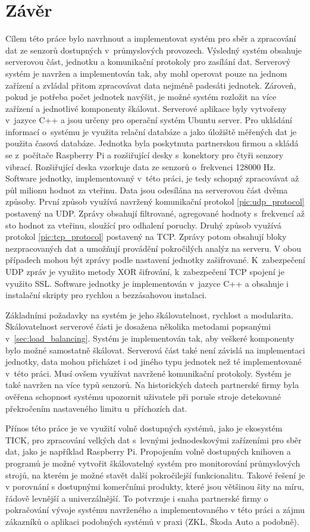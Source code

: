 \chapter{Závěr}
Cílem této práce bylo navrhnout a implementovat systém pro sběr a zpracování dat ze senzorů dostupných v~průmyslových provozech. Výsledný systém obsahuje serverovou část, jednotku a komunikační protokoly pro zasílání dat. Serverový systém je navržen a implementován tak, aby mohl operovat pouze na jednom zařízení a zvládal přitom zpracovávat data nejméně padesáti jednotek. Zároveň, pokud je potřeba počet jednotek navýšit, je možné systém rozložit na více zařízení a jednotlivé komponenty škálovat. Serverové aplikace byly vytvořeny v~jazyce C++ a jsou určeny pro operační systém Ubuntu server. Pro ukládání informací o~systému je využita relační databáze a jako úložiště měřených dat je použita časová databáze. Jednotka byla poskytnuta partnerskou firmou a skládá se z~počítače Raspberry Pi a rozšiřující desky s~konektory pro čtyři senzory vibrací. Rozšiřující deska vzorkuje data ze senzorů o~frekvenci 128000 Hz. Software jednotky, implementovaný v~této práci, je tedy schopný zpracovávat až půl milionu hodnot za vteřinu. Data jsou odesílána na serverovou část dvěma způsoby. První způsob využívá navržený komunikační protokol \ref{pic:udp_protocol} postavený na UDP. Zprávy obsahují filtrované, agregované hodnoty s~frekvencí až sto hodnot za vteřinu, sloužící pro odhalení poruchy. Druhý způsob využívá protokol \ref{pic:tcp_protocol} postavený na TCP. Zprávy potom obsahují bloky nezpracovaných dat a umožňují provádění pokročilých analýz na serveru. V obou případech mohou být zprávy podle nastavení jednotky zašifrované. K~zabezpečení UDP zpráv je využito metody XOR šifrování, k~zabezpečení TCP spojení je využito SSL. Software jednotky je implementován v~jazyce C++ a obsahuje i instalační skripty pro rychlou a bezzásahovou instalaci.


Základními požadavky na systém je jeho škálovatelnost, rychlost a modularita. Škálovatelnost serverové části je dosažena několika metodami popsanými v~\ref{sec:load_balancing}. Systém je implementován tak, aby veškeré komponenty bylo možné samostatně škálovat. Serverová část také není závislá na implementaci jednotky, data mohou přicházet i od jiného typu jednotek než té implementované v~této práci. Musí ovšem využívat navržené komunikační protokoly. Systém je také navržen na více typů senzorů. Na historických datech partnerské firmy byla ověřena schopnost systému upozornit uživatele při poruše stroje detekované překročením nastaveného limitu u~příchozích dat.

Přínos této práce je ve využití volně dostupných systémů, jako je ekosystém TICK, pro zpracování velkých dat s~levnými jednodeskovými zařízeními pro sběr dat, jako je například Raspberry Pi. Propojením volně dostupných knihoven a programů je možné vytvořit škálovatelný systém pro monitorování průmyslových strojů, na kterém je možné stavět další pokročilejší funkcionalitu. Takové řešení je v porovnání s dostupnými komerčními produkty, které jsou většinou šity na míru, řádově levnější a univerzálnější. To potvrzuje i snaha partnerské firmy o pokračování vývoje systému navrženého a implementovaného v této práci a zájmu zákazníků o aplikaci podobných systémů v praxi (ZKL, Škoda Auto a podobně).
